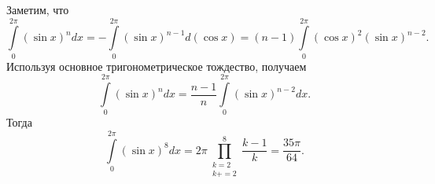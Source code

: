 \documentclass{article}
\begin{document}
Заметим, что
$$\int\limits_0^{2\pi} (\sin x)^n dx = -\int\limits_0^{2\pi} (\sin x)^{n-1} d(\cos x) = (n-1) \int\limits_0^{2\pi} (\cos x)^2 (\sin x)^{n-2}.$$
Используя основное тригонометрическое тождество, получаем
$$\int\limits_0^{2\pi} (\sin x)^n dx = \frac{n-1}{n} \int\limits_0^{2\pi} (\sin x)^{n-2} dx.$$
Тогда
$$\int\limits_0^{2\pi} (\sin x)^8 dx = 2\pi \prod_{\substack{k=2\\k+=2}}^8 \frac{k-1}{k} = \frac{35\pi}{64}.$$
\end{document}
